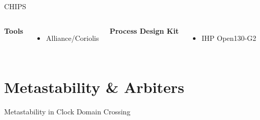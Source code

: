 \begin{frame}{CHIPS \cite{noauthor_european_2025}}{\insertsection}


    \begin{columns}
        \centering
        \textbf{Tools}
        \begin{itemize}
            \item Alliance/Coriolis \cite{noauthor_coriolis_nodate}
        \end{itemize}

        \centering
        \textbf{Process Design Kit}
        \begin{itemize}
            \item IHP Open130-G2
        \end{itemize}
    \end{columns}
\end{frame}

\section{Metastability \& Arbiters}
\begin{frame}{Metastability in Clock Domain Crossing}{\insertsection}
\end{frame}

